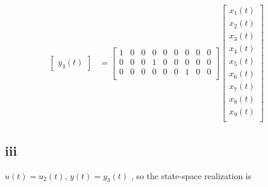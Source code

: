 \documentclass[12pt,a4paper]{article}
\begin{document}
\[\begin{aligned}
\begin{bmatrix}
            y_3(t)
        \end{bmatrix} & = \begin{bmatrix}
                            1 & 0 & 0 & 0 & 0 & 0 & 0 & 0 & 0 \\
                            0 & 0 & 0 & 1 & 0 & 0 & 0 & 0 & 0 \\
                            0 & 0 & 0 & 0 & 0 & 0 & 1 & 0 & 0 \\
                        \end{bmatrix} \begin{bmatrix}
                                        x_1(t) \\
                                        x_2(t) \\
                                        x_3(t) \\
                                        x_4(t) \\
                                        x_5(t) \\
                                        x_6(t) \\
                                        x_7(t) \\
                                        x_8(t) \\
                                        x_9(t) \\
                                    \end{bmatrix}
    \end{aligned}
\]

\subsection*{iii}
$u(t) = u_2(t)$, $y(t) = y_3(t)$
, so the state-space realization is
\end{document}
